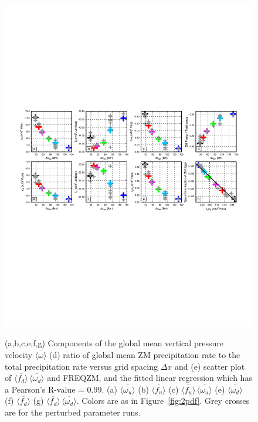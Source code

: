 \begin{figure}[t]
\begin{center}
\noindent\includegraphics[width=33pc,angle=0]{chapter6/temp_diags_8panel.pdf}\\
\end{center}
\caption{(a,b,c,e,f,g) Components of the global mean vertical pressure velocity $\overline{\langle \omega \rangle}$ (d) ratio of global mean ZM precipitation rate to the total precipitation rate versus grid spacing $\Delta x$ and (e) scatter plot of $\overline{\langle f_{d} \rangle} \, \overline{\langle \omega_{d} \rangle}$ and FREQZM, and the fitted linear regression which has a Pearson's R-value = 0.99. (a) $\overline{\langle \omega_{u} \rangle}$ (b) $\overline{\langle f_{u} \rangle}$ (c) $\overline{\langle f_{u} \rangle} \, \overline{\langle \omega_{u} \rangle}$ (e) $\overline{\langle \omega_{d} \rangle}$ (f) $ \overline{\langle f_{d} \rangle}$ (g) $\overline{\langle f_{d} \rangle} \, \overline{\langle \omega_{d} \rangle}$. Colors are as in Figure~\ref{fig:2pdf}. Grey crosses are for the perturbed parameter runs.}
\label{fig:8panel}
\end{figure}

